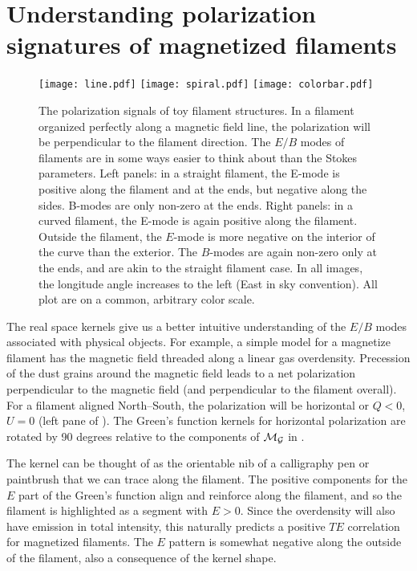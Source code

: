 \section{Understanding polarization signatures of magnetized filaments}
% 
\begin{figure}[t]
\texttt{[image: line.pdf]}
\texttt{[image: spiral.pdf]}
\texttt{[image: colorbar.pdf]}
\caption{ The polarization signals of toy filament structures. In a filament organized perfectly along a magnetic field line, the polarization will be perpendicular to the filament direction.  The $E/B$ modes of filaments are in some ways easier to think about than the Stokes parameters. Left panels: in a straight filament, the E-mode is positive along the filament and at the ends, but negative along the sides.  B-modes are only non-zero at the ends.  Right panels: in a curved filament, the E-mode is again positive along the filament.  Outside the filament, the $E$-mode is more negative on the interior of the curve than the exterior.  The $B$-modes are again non-zero only at the ends, and are akin to the straight filament case. In all images, the longitude angle increases to the left (East in sky convention).  All plot are on a common, arbitrary color scale.}
\label{fig:polfilaments}
\end{figure}
%

The real space kernels give us a better intuitive understanding of the $E/B$ modes associated with physical objects.  For example, a simple model for a magnetize filament has the magnetic field threaded along a linear gas overdensity.  Precession of the dust grains around the magnetic field leads to a net polarization perpendicular to the magnetic field (and perpendicular to the filament overall).  For a filament aligned North--South, the polarization will be horizontal or $Q<0$, $U=0$ (left pane of ).  The Green's function kernels for horizontal polarization are rotated by 90 degrees relative to the components of $\cal{M}_G$ in .

The kernel can be thought of as the orientable nib of a calligraphy pen or paintbrush that we can trace along the filament.  The positive components for the $E$ part of the Green's function align and reinforce along the filament, and so the filament is highlighted as a segment with $E>0$.  Since the overdensity will also have emission in total intensity, this naturally predicts a positive $TE$ correlation for magnetized filaments.  The $E$ pattern is somewhat negative along the outside of the filament, also a consequence of the kernel shape.

